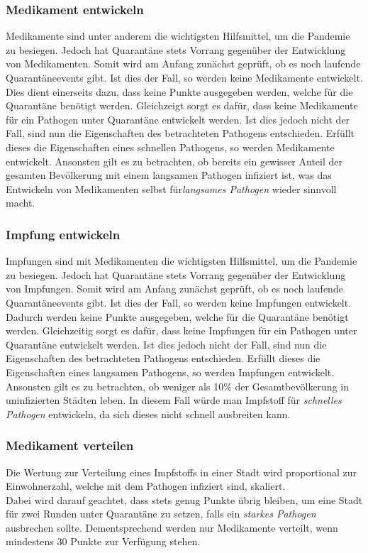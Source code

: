 \documentclass{article}
\let\oldgls\gls
\renewcommand{\gls}[1]{\emph{\oldgls{#1}}} %
\begin{document}
\subsubsection{Medikament entwickeln}
Medikamente sind unter anderem die wichtigsten Hilfsmittel, um die Pandemie zu besiegen. Jedoch hat Quarantäne stets Vorrang gegenüber der Entwicklung von Medikamenten. Somit wird am Anfang zunächst geprüft, ob es noch laufende Quarantäneevents gibt. Ist dies der Fall, so werden keine Medikamente entwickelt. Dies dient einerseits dazu, dass keine Punkte ausgegeben werden, welche für die Quarantäne benötigt werden. Gleichzeigt sorgt es dafür, dass keine Medikamente für ein Pathogen unter Quarantäne entwickelt werden.
Ist dies jedoch nicht der Fall, sind nun die Eigenschaften des betrachteten Pathogens entschieden. Erfüllt dieses die Eigenschaften eines schnellen Pathogens, so werden Medikamente entwickelt. Ansonsten gilt es zu betrachten, ob bereits ein gewisser Anteil der gesamten Bevölkerung mit einem langsamen Pathogen infiziert ist, was das Entwickeln von Medikamenten selbst für\gls{langsames Pathogen} wieder sinnvoll macht.
\subsubsection{Impfung entwickeln}
Impfungen sind mit Medikamenten die wichtigsten Hilfsmittel, um die Pandemie zu besiegen. Jedoch hat Quarantäne stets Vorrang gegenüber der Entwicklung von Impfungen. Somit wird am Anfang zunächst geprüft, ob es noch laufende Quarantäneevents gibt. Ist dies der Fall, so werden keine Impfungen entwickelt. Dadurch werden keine Punkte ausgegeben, welche für die Quarantäne benötigt werden. Gleichzeitig sorgt es dafür, dass keine Impfungen für ein Pathogen unter Quarantäne entwickelt werden.
Ist dies jedoch nicht der Fall, sind nun die Eigenschaften des betrachteten Pathogens entschieden. Erfüllt dieses die Eigenschaften eines langsamen Pathogens, so werden Impfungen entwickelt. Ansonsten gilt es zu betrachten, ob weniger als 10\% der Gesamtbevölkerung in uninfizierten Städten leben. In diesem Fall würde man Impfstoff für \gls{schnelles Pathogen} entwickeln, da sich dieses nicht schnell ausbreiten kann.
\subsubsection{Medikament verteilen}
Die Wertung zur Verteilung eines Impfstoffs in einer Stadt wird proportional zur Einwohnerzahl, welche mit dem Pathogen infiziert sind, skaliert. \\
Dabei wird darauf geachtet, dass stets genug Punkte übrig bleiben, um eine Stadt für zwei Runden unter Quarantäne zu setzen, falls ein \gls{starkes Pathogen} ausbrechen sollte. Dementsprechend werden nur Medikamente verteilt, wenn mindestens 30 Punkte zur Verfügung stehen.
\end{document}
